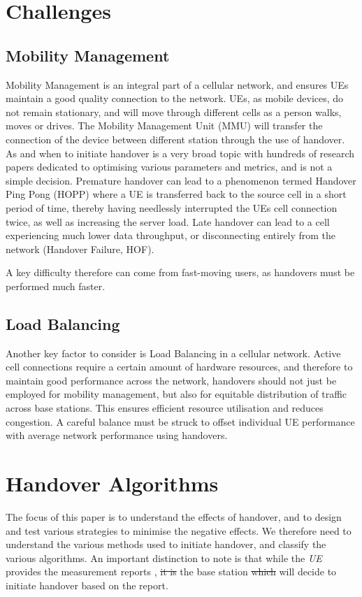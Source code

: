\section{Challenges}
\subsection{Mobility Management}
Mobility Management is an integral part of a cellular network, and ensures UEs maintain a good quality connection to the network. UEs, as mobile devices, do not remain stationary, and will move through different cells as a person walks, moves or drives. The Mobility Management Unit (MMU) will transfer the connection of the device between different station through the use of handover. As and when to initiate handover is a very broad topic with hundreds of research papers dedicated to optimising various parameters and metrics, and is not a simple decision. Premature handover can lead to a phenomenon termed Handover Ping Pong (HOPP) where a UE is transferred back to the source cell in a short period of time, thereby having needlessly interrupted the UEs cell connection twice, as well as increasing the server load. Late handover can lead to a cell experiencing much lower data throughput, or disconnecting entirely from the network (Handover Failure, HOF).

A key difficulty therefore can come from fast-moving users, as handovers must be performed much faster.

\subsection{Load Balancing}
Another key factor to consider is Load Balancing in a cellular network. Active cell connections require a certain amount of hardware resources, and therefore to maintain good performance across the network, handovers should not just be employed for mobility management, but also for equitable distribution of traffic across base stations. This ensures efficient resource utilisation and reduces congestion. A careful balance must be struck to offset individual UE performance with average network performance using handovers.

\section{Handover Algorithms}
The focus of this paper is to understand the effects of handover, and to design and test various strategies to minimise the negative effects. We therefore need to understand the various methods used to initiate handover, and classify the various algorithms. An important distinction to note is that while the \textit{UE} provides the measurement reports , \st{it is} the base station \st{which} will decide to initiate handover based on the report.
